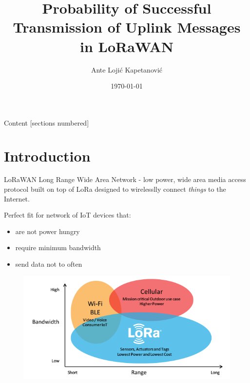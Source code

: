 \documentclass{beamer}
\title{Probability of Successful Transmission of Uplink Messages in LoRaWAN}
\date{\today}
\author{Ante Lojić Kapetanović}
\institute{Department of Electronic Systems @AAU}
\begin{document}
  \maketitle

  \begin{frame}{Content}
    [sections numbered]
    \tableofcontents[hideallsubsections]
  \end{frame}

  \section{Introduction}
  \begin{frame}[fragile]{LoRaWAN}
    \alert{Long Range Wide Area Network} - low power, wide area media access protocol built on top of LoRa designed to wirelesslly connect \textit{things} to the Internet.

    Perfect fit for network of IoT devices that:
    \begin{itemize}
      \item are not power hungry
      \item require minimum bandwidth
      \item send data not to often
    \end{itemize}
  \end{frame}
  \begin{frame}[fragile]
    \begin{center}
      \begin{figure}
        \includegraphics[width=\linewidth]{images/bw_range.png}
      \end{figure}
    \end{center}
  \end{frame}
\end{document}
